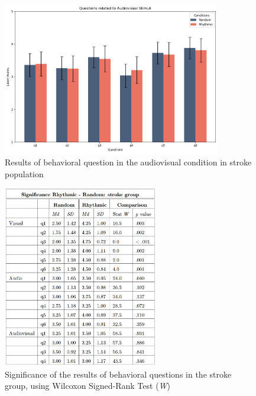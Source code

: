 \begin{figure}[H]
    \centering
    \includegraphics[width=0.85\textwidth]{bar_plots/plotbar_audiovisual_s.png}
    \caption{Results of behavioral question in the audiovisual condition in stroke population}
    \label{fig: bar_audiovisual_stroke} 
\end{figure} 
\begin{figure}[H]
    \centering
    \includegraphics[width=0.60\textwidth]{significance_tables/stroke_group.png}
    \caption{Significance of the results of behavioral questions in the stroke group, using Wilcoxon Signed-Rank Test (\textit{W})}
    \label{fig: significance_stroke_pop} 
\end{figure} 

